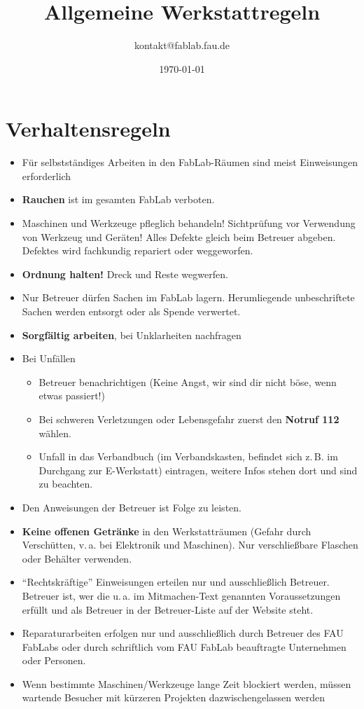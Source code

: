\documentclass[13pt]{\basedir/fablab-document}
\date{\today}
\author{kontakt@fablab.fau.de}
\title{Allgemeine Werkstattregeln}
\begin{document}
\maketitle

\vbox{\vspace{1cm}}


\section{Verhaltensregeln}
\begin{itemize}
  \item Für selbstständiges Arbeiten in den FabLab-Räumen sind meist Einweisungen erforderlich
  \item \textbf{Rauchen} ist im gesamten FabLab verboten.
  \item Maschinen und Werkzeuge pfleglich behandeln! Sichtprüfung vor Verwendung von Werkzeug und Geräten! Alles Defekte gleich beim Betreuer abgeben. Defektes wird fachkundig repariert oder weggeworfen.
  \item \textbf{Ordnung halten!} Dreck und Reste wegwerfen.
  \item Nur Betreuer dürfen Sachen im FabLab lagern. Herumliegende unbeschriftete Sachen werden entsorgt oder als Spende verwertet. 
  \item \textbf{Sorgfältig arbeiten}, bei Unklarheiten nachfragen
  \item Bei Unfällen
  \begin{itemize}
  	\item Betreuer benachrichtigen (Keine Angst, wir sind dir nicht böse, wenn etwas passiert!)
  	\item Bei schweren Verletzungen oder Lebensgefahr zuerst den \textbf{Notruf 112} wählen.
  	\item Unfall in das Verbandbuch (im Verbandskasten, befindet sich z.\,B. im Durchgang zur E-Werkstatt) eintragen, weitere Infos stehen dort und sind zu beachten.
  \end{itemize} 
  \item Den Anweisungen der Betreuer ist Folge zu leisten.
  \item \textbf{Keine offenen Getränke} in den Werkstatträumen (Gefahr durch Verschütten, v.\,a. bei Elektronik und Maschinen). Nur verschließbare Flaschen oder Behälter verwenden.
  \item \enquote{Rechtskräftige} Einweisungen erteilen nur und ausschließlich Betreuer. Betreuer ist, wer die u.\,a. im Mitmachen-Text genannten Voraussetzungen erfüllt und als Betreuer in der Betreuer-Liste auf der Website steht.
  \item Reparaturarbeiten erfolgen nur und ausschließlich durch Betreuer des FAU FabLabs oder durch schriftlich vom FAU FabLab beauftragte Unternehmen oder Personen.
  \item Wenn bestimmte Maschinen/Werkzeuge lange Zeit blockiert werden, müssen wartende Besucher mit kürzeren Projekten dazwischengelassen werden
\end{itemize}
\vbox{\vspace{0,5cm}}
\end{document}
